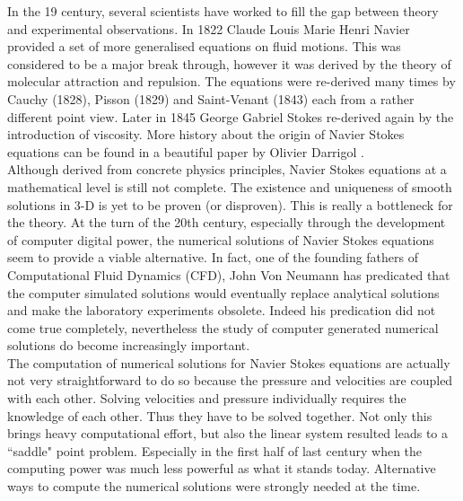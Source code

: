 In the 19 century, several scientists have worked to fill the gap between theory and experimental observations. In 1822 Claude Louis Marie Henri Navier provided a set of more generalised equations on fluid motions. This was considered to be a major break through, however it was derived by the theory of molecular attraction and repulsion. The equations were re-derived many times by Cauchy (1828), Pisson (1829) and Saint-Venant (1843) each from a rather different point view. Later in 1845 George Gabriel Stokes re-derived again by the introduction of viscosity. More history about the origin of Navier Stokes equations can be found in a beautiful paper by Olivier Darrigol \cite{darrigol2002between}.\\

Although derived from concrete physics principles, Navier Stokes equations at a mathematical level is still not complete. The existence and uniqueness of smooth solutions in 3-D is yet to be proven (or disproven). This is really a bottleneck for the theory. At the turn of the 20th century, especially through the development of computer digital power, the numerical solutions of Navier Stokes equations seem to provide a viable alternative. In fact, one of the founding fathers of Computational Fluid Dynamics (CFD), John Von Neumann has predicated that the computer simulated solutions would eventually replace analytical solutions and make the laboratory experiments obsolete. Indeed his predication did not come true completely, nevertheless the study of computer generated numerical solutions do become increasingly important.\\

The computation of numerical solutions for Navier Stokes equations are actually not very straightforward to do so because the pressure and velocities are coupled with each other. Solving velocities and pressure individually requires the knowledge of each other. Thus they have to be solved together. Not only this brings heavy computational effort, but also the linear system resulted leads to a ``saddle" point problem. Especially in the first half of last century when the computing power was much less powerful as what it stands today. Alternative ways to compute the numerical solutions were strongly needed at the time.\\



